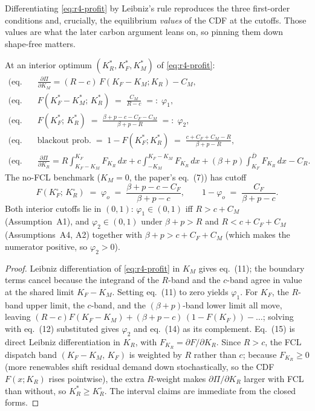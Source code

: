 Differentiating \eqref{eq:r4-profit} by Leibniz's rule reproduces the three
first-order conditions and, crucially, the equilibrium \emph{values} of the CDF at
the cutoffs. Those values are what the later carbon argument leans on, so pinning
them down shape-free matters.

\begin{lemma}
\label{lem:r4-cutoffs}
At an interior optimum $(K_R^*,K_F^*,K_M^*)$ of \eqref{eq:r4-profit}:
\begin{align}
\text{(eq.\ 11)}\quad & \frac{\partial \Pi}{\partial K_M}
   = (R-c)\,F(K_F-K_M;K_R) - C_M, \\[2pt]
\text{(eq.\ 12)}\quad & F(K_F^*-K_M^*;\,K_R^*) \;=\; \frac{C_M}{R-c}
   \;=:\; \varphi_1, \\[2pt]
\text{(eq.\ 13)}\quad & F(K_F^*;\,K_R^*) \;=\;
   \frac{\beta+p-c-C_F-C_M}{\beta+p-R} \;=:\; \varphi_2, \\[2pt]
\text{(eq.\ 14)}\quad & \text{blackout prob.} \;=\; 1-F(K_F^*;K_R^*)
   \;=\; \frac{c+C_F+C_M-R}{\beta+p-R}, \\[2pt]
\text{(eq.\ 15)}\quad & \frac{\partial \Pi}{\partial K_R}
   = R\!\int_{K_F-K_M}^{K_F}\!\! F_{K_R}\,dx
   + c\!\int_{-K_M}^{K_F-K_M}\!\! F_{K_R}\,dx
   + (\beta+p)\!\int_{K_F}^{\bar D}\!\! F_{K_R}\,dx - C_R .
\end{align}
The no-FCL benchmark ($K_M=0$, the paper's eq.~(7)) has cutoff
\begin{equation}
\label{eq:r4-phio}
F(K_F^\circ;\,K_R^\circ) \;=\; \varphi_o \;=\; \frac{\beta+p-c-C_F}{\beta+p-c},
\qquad
1-\varphi_o \;=\; \frac{C_F}{\beta+p-c}.
\end{equation}
Both interior cutoffs lie in $(0,1)$: $\varphi_1\in(0,1)$ iff $R>c+C_M$
(Assumption~A1), and $\varphi_2\in(0,1)$ under $\beta+p>R$ and $R<c+C_F+C_M$
(Assumptions~A4, A2) together with $\beta+p>c+C_F+C_M$ (which makes the numerator
positive, so $\varphi_2>0$).
\end{lemma}

\begin{proof}
Leibniz differentiation of \eqref{eq:r4-profit} in $K_M$ gives eq.~(11); the boundary
terms cancel because the integrand of the $R$-band and the $c$-band agree in value at
the shared limit $K_F-K_M$. Setting eq.~(11) to zero yields $\varphi_1$. For $K_F$, the
$R$-band upper limit, the $c$-band, and the $(\beta+p)$-band lower limit all move,
leaving $(R-c)F(K_F-K_M)+ (\beta+p-c)\,(1-F(K_F)) - \dots$; solving with eq.~(12)
substituted gives $\varphi_2$ and eq.~(14) as its complement. Eq.~(15) is direct
Leibniz differentiation in $K_R$, with $F_{K_R}=\partial F/\partial K_R$. Since $R>c$,
the FCL dispatch band $(K_F-K_M,\,K_F)$ is weighted by $R$ rather than $c$; because
$F_{K_R}\ge 0$ (more renewables shift residual demand down stochastically, so the CDF
$F(x;K_R)$ rises pointwise), the extra $R$-weight makes $\partial\Pi/\partial K_R$
larger with FCL than without, so $K_R^*\ge K_R^\circ$. The
interval claims are immediate from the closed forms.
\end{proof}

